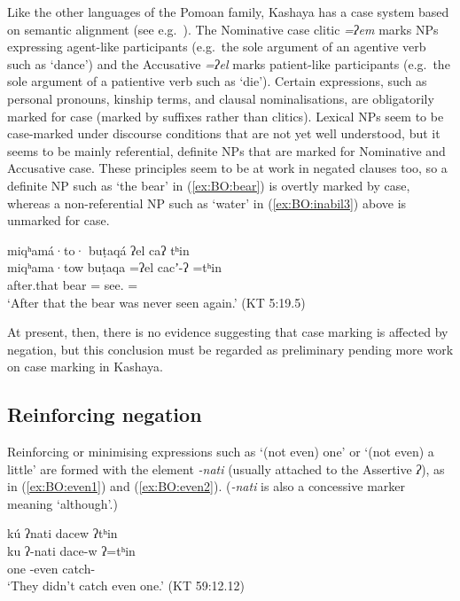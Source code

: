 \documentclass[output=paper,modfonts,nonflat,colorlinks,citecolor=brown]{langscibook}
\begin{document}
\label{sec:BO:flag}
Like the other languages of the Pomoan family, Kashaya has a case system
based on semantic alignment (see e.g.\ \citealt{Mithun1991}). The Nominative case clitic \textit{=ʔem} marks NPs expressing agent-like participants (e.g.\ the sole argument of an agentive verb such as `dance') and the Accusative \textit{=ʔel} marks patient-like participants (e.g.\ the sole argument of a patientive verb such as `die'). Certain expressions, such as personal pronouns, kinship terms, and clausal nominalisations, are obligatorily marked for case (marked by suffixes rather than clitics). Lexical NPs seem to be case-marked under discourse conditions that are not yet well understood, but it seems to be mainly referential, definite NPs that are marked for Nominative and Accusative case. These principles seem to be at work in negated clauses too, so a definite NP such as `the bear' in (\ref{ex:BO:bear}) is overtly marked by case, whereas a non-referential NP such as `water' in (\ref{ex:BO:inabil3}) above is unmarked for case.

\ea 
\label{ex:BO:bear}
\glll miqʰamá·to· buṭaqá ʔel caʔ tʰin\\
    miqʰama·tow buṭaqa =ʔel cacʼ-ʔ =tʰin\\
    after.that bear = see. =\\
\glt `After that the bear was never seen again.' ({KT 5:19.5})\\
\z

At present, then, there is no evidence suggesting that case marking is affected by negation, but this conclusion must be regarded as preliminary pending more work on case marking in Kashaya.

\subsection{Reinforcing negation}
Reinforcing or minimising expressions such as `(not even) one' or `(not even) a little' are formed with the element \textit{-nati} (usually attached to the Assertive \textit{ʔ}), as in (\ref{ex:BO:even1}) and (\ref{ex:BO:even2}). (\textit{-nati} is also a concessive marker meaning `although'.)

{%
\ea 
\label{ex:BO:even1}
\glll kú ʔnati dacew ʔtʰin\\
    ku ʔ-nati dace-w ʔ=tʰin\\
    one -even catch- \\
\glt `They didn’t catch even one.' ({KT 59:12.12})\\
\z
}%
\end{document}
